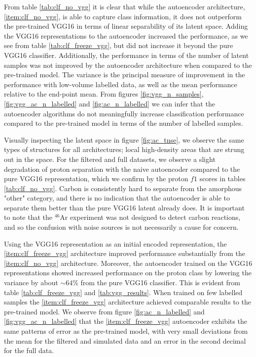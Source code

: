 From table \ref{tab:clf_no_vgg} it is clear that while the autoencoder architecture, \ref{item:clf_no_vgg}, is able to capture class information, it does not outperform the pre-trained VGG16 in terms of linear separability of its latent space. Adding the VGG16 representations to the autoencoder increased the performance, as we see from table \ref{tab:clf_freeze_vgg}, but did not increase it beyond the pure VGG16 classifier.  Additionally, the performance in terms of the number of latent samples was not improved by the autoencoder architecture when compared to the pre-trained model. The variance is the principal measure of improvement in the performance with low-volume labelled data, as well as the mean performance relative to the end-point mean. From figures \ref{fig:vgg_n_samples}, \ref{fig:vgg_ac_n_labelled}  and \ref{fig:ac_n_labelled} we can infer that the autoencoder algorithms do not meaningfully increase classification performance compared to the pre-trained model in terms of the number of labelled samples.

Visually inspecting the latent space in figure \ref{fig:ac_tnse}, we observe the same types of structures for all architectures; local high-density areas that are strung out in the space. For the filtered and full datasets, we observe a slight degradation of proton separation with the naive autoencoder compared to the pure VGG16 representation, which we confirm by the proton $f1$ scores in tables \ref{tab:clf_no_vgg}. Carbon is consistently hard to separate from the amorphous "other" category, and there is no indication that the autoencoder is able to separate them better than the pure VGG16 latent already does. It is important to note that the ${}^{46}$Ar experiment was not designed to detect carbon reactions, and so the confusion with noise sources is not necessarily a cause for concern. 

Using the VGG16 representation as an initial encoded representation, the \ref{item:clf_freeze_vgg} architecture improved performance substantially from the \ref{item:clf_no_vgg} architecture. Moreover, the autoencoder trained on the VGG16 representations showed increased performance on the proton class by lowering the variance by about $\sim 64\%$ from the pure VGG16 classifier. This is evident from table \ref{tab:clf_freeze_vgg} and \ref{tab:vgg_results}. When trained on few labelled samples the \ref{item:clf_freeze_vgg} architecture achieved comparable results to the pre-trained model. We observe from figure \ref{fig:ac_n_labelled} and \ref{fig:vgg_ac_n_labelled} that the \ref{item:clf_freeze_vgg} autoencoder exhibits the same patterns of error as the pre-trained model, with very small deviations from the mean for the filtered and simulated data and an error in the second decimal for the full data.

